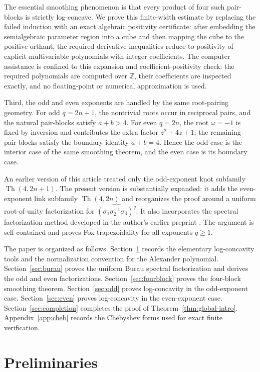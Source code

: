 \documentclass[11pt]{amsart}
\newcommand{\Th}{\operatorname{Th}}
\begin{document}
The essential smoothing phenomenon is that every product of four such pair-blocks is strictly log-concave.  We prove this finite-width estimate by replacing the failed induction with an exact algebraic positivity certificate: after embedding the semialgebraic parameter region into a cube and then mapping the cube to the positive orthant, the required derivative inequalities reduce to positivity of explicit multivariable polynomials with integer coefficients.  The computer assistance is confined to this expansion and coefficient-positivity check: the required polynomials are computed over \(\mathbb Z\), their coefficients are inspected exactly, and no floating-point or numerical approximation is used.

Third, the odd and even exponents are handled by the same root-pairing geometry.  For odd \(q=2n+1\), the nontrivial roots occur in reciprocal pairs, and the natural pair-blocks satisfy \(a+b>4\).  For even \(q=2n\), the root \(\omega=-1\) is fixed by inversion and contributes the extra factor \(z^2+4z+1\); the remaining pair-blocks satisfy the boundary identity \(a+b=4\).  Hence the odd case is the interior case of the same smoothing theorem, and the even case is its boundary case.

An earlier version of this article treated only the odd-exponent knot
subfamily \(\Th(4,2n+1)\).  The present version is substantially
expanded: it adds the even-exponent link subfamily \(\Th(4,2n)\) and
reorganizes the proof around a uniform root-of-unity factorization for
\(\widehat{(\sigma_1\sigma_2^{-1}\sigma_3)^q}\).  It also incorporates
the spectral factorization method developed in the author's earlier
preprint \cite{SaurabhSpectral}.  The argument is self-contained and
proves Fox trapezoidality for all exponents \(q\geq 1\).

The paper is organized as follows.  Section~\ref{sec:prelim} records the elementary log-concavity tools and the normalization convention for the Alexander polynomial.  Section~\ref{sec:burau} proves the uniform Burau spectral factorization and derives the odd and even factorizations.  Section~\ref{sec:fourblock} proves the four-block smoothing theorem.  Section~\ref{sec:odd} proves log-concavity in the odd-exponent case.  Section~\ref{sec:even} proves log-concavity in the even-exponent case.  Section~\ref{sec:completion} completes the proof of Theorem~\ref{thm:global-intro}.  Appendix~\ref{app:cheb} records the Chebyshev forms used for exact finite verification.

\section{Preliminaries}\label{sec:prelim}
\end{document}
